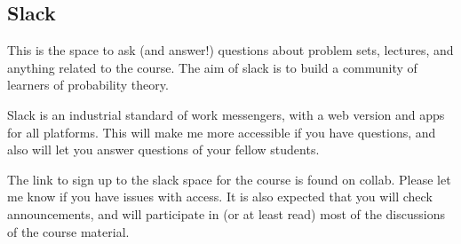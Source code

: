 \documentclass[oneside,11pt]{amsart}
\begin{document}
\subsection{Slack}
\label{sub:slack}

This is the space to ask (and answer!) 
questions about problem sets, 
lectures, and anything related to the course. The aim of slack is to build a community of learners
of probability theory.

Slack is an
industrial standard of work messengers, with a web version and apps for all
platforms. This will make me more accessible if you have questions, and also
will let you answer questions of your fellow students.

The link to sign up to the slack space for the course is found on collab.
Please
let me know if you have issues with access. 
It is also expected that you
will check announcements, and will participate in (or at least read)
most of the discussions of the course material.
\end{document}
